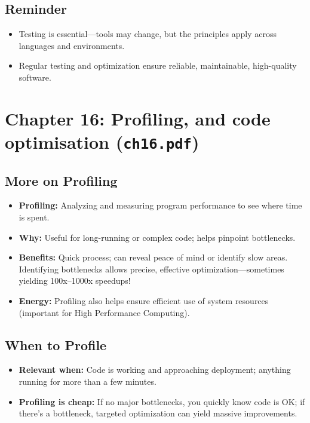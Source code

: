 \documentclass[11pt,a4paper]{article}
\begin{document}
\subsection*{Reminder}
\begin{itemize}
    \item Testing is essential—tools may change, but the principles apply across languages and environments.
    \item Regular testing and optimization ensure reliable, maintainable, high-quality software.
\end{itemize}

\section{Chapter 16: Profiling, and code optimisation (\texttt{ch16.pdf})}

\subsection*{More on Profiling}
\begin{itemize}
    \item \textbf{Profiling:} Analyzing and measuring program performance to see where time is spent.
    \item \textbf{Why:} Useful for long-running or complex code; helps pinpoint bottlenecks.
    \item \textbf{Benefits:} Quick process; can reveal peace of mind or identify slow areas. Identifying bottlenecks allows precise, effective optimization—sometimes yielding 100x–1000x speedups!
    \item \textbf{Energy:} Profiling also helps ensure efficient use of system resources (important for High Performance Computing).
\end{itemize}

\subsection*{When to Profile}
\begin{itemize}
    \item \textbf{Relevant when:} Code is working and approaching deployment; anything running for more than a few minutes.
    \item \textbf{Profiling is cheap:} If no major bottlenecks, you quickly know code is OK; if there’s a bottleneck, targeted optimization can yield massive improvements.
\end{itemize}
\end{document}
